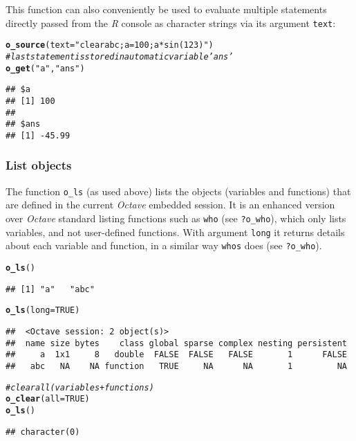 \documentclass[english,10pt,a4paper]{article}\usepackage[]{graphicx}\usepackage[]{color}
\makeatletter
\newcommand{\hlnum}[1]{\textcolor[rgb]{0.686,0.059,0.569}{#1}}%
\newcommand{\hlstr}[1]{\textcolor[rgb]{0.192,0.494,0.8}{#1}}%
\newcommand{\hlcom}[1]{\textcolor[rgb]{0.678,0.584,0.686}{\textit{#1}}}%
\newcommand{\hlstd}[1]{\textcolor[rgb]{0.345,0.345,0.345}{#1}}%
\newcommand{\hlkwc}[1]{\textcolor[rgb]{0.333,0.667,0.333}{#1}}%
\newcommand{\hlkwd}[1]{\textcolor[rgb]{0.737,0.353,0.396}{\textbf{#1}}}%
\newenvironment{kframe}{%
 \def\at@end@of@kframe{}%
 \ifinner\ifhmode%
  \def\at@end@of@kframe{\end{minipage}}%
  \begin{minipage}{\columnwidth}%
 \fi\fi%
 \def\FrameCommand##1{\hskip\@totalleftmargin \hskip-\fboxsep
 \colorbox{shadecolor}{##1}\hskip-\fboxsep
     \hskip-\linewidth \hskip-\@totalleftmargin \hskip\columnwidth}%
 \MakeFramed {\advance\hsize-\width
   \@totalleftmargin\z@ \linewidth\hsize
   \@setminipage}}%
 {\par\unskip\endMakeFramed%
 \at@end@of@kframe}
\newenvironment{knitrout}{}{} %
\let\proglang=\textit
\let\code=\texttt
\newcommand{\R}{\proglang{R}\xspace}
\newcommand{\octave}{\proglang{Octave}\xspace}
\makeatother
\begin{document}
This function can also conveniently be used to evaluate multiple statements
directly passed from the \R console as character strings via its argument
\code{text}:

\begin{knitrout}
\color{fgcolor}\begin{kframe}
\begin{alltt}
\hlkwd{o_source}\hlstd{(}\hlkwc{text} \hlstd{=} \hlstr{"clear a b c; a=100; a*sin(123)"}\hlstd{)}
\hlcom{# last statement is stored in automatic variable 'ans'}
\hlkwd{o_get}\hlstd{(}\hlstr{"a"}\hlstd{,} \hlstr{"ans"}\hlstd{)}
\end{alltt}
\begin{verbatim}
## $a
## [1] 100
## 
## $ans
## [1] -45.99
\end{verbatim}
\end{kframe}
\end{knitrout}


\subsubsection{List objects}

The function \code{o\_ls} (as used above) lists the objects (variables and
functions) that are defined in the current \octave embedded session.
It is an enhanced version over \octave standard listing functions such as
\code{who} (see \code{?o\_who}), which only lists variables, and not
user-defined functions.
With argument \code{long} it returns details about each variable and function,
in a similar way \code{whos} does (see \code{?o\_who}).

\begin{knitrout}
\color{fgcolor}\begin{kframe}
\begin{alltt}
\hlkwd{o_ls}\hlstd{()}
\end{alltt}
\begin{verbatim}
## [1] "a"   "abc"
\end{verbatim}
\begin{alltt}
\hlkwd{o_ls}\hlstd{(}\hlkwc{long} \hlstd{=} \hlnum{TRUE}\hlstd{)}
\end{alltt}
\begin{verbatim}
##  <Octave session: 2 object(s)>
##  name size bytes    class global sparse complex nesting persistent
##     a  1x1     8   double  FALSE  FALSE   FALSE       1      FALSE
##   abc   NA    NA function   TRUE     NA      NA       1         NA
\end{verbatim}
\begin{alltt}
\hlcom{# clear all (variables + functions)}
\hlkwd{o_clear}\hlstd{(}\hlkwc{all} \hlstd{=} \hlnum{TRUE}\hlstd{)}
\hlkwd{o_ls}\hlstd{()}
\end{alltt}
\begin{verbatim}
## character(0)
\end{verbatim}
\end{kframe}
\end{knitrout}
\end{document}
